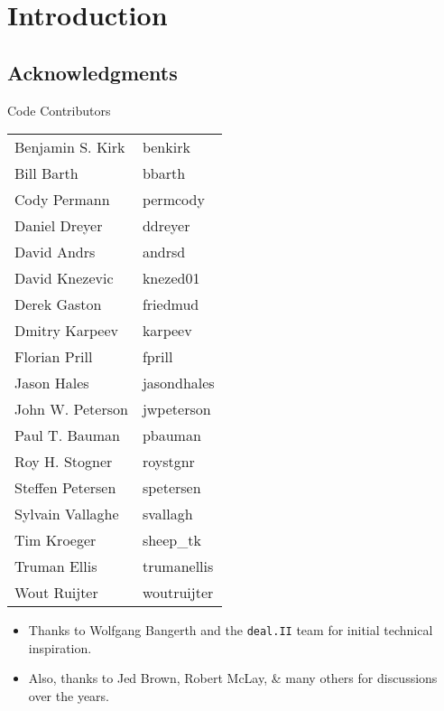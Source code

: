 




\section{Introduction}

\subsection{Acknowledgments}
\begin{frame}[shrink]
  \begin{block}{Code Contributors}
    \scriptsize
    \begin{center}
      \begin{tabular}{|l|l|} \hline
        Benjamin S. Kirk & benkirk \\
        Bill Barth       & bbarth \\
        Cody Permann     & permcody \\
        Daniel Dreyer    & ddreyer \\
        David Andrs      & andrsd \\
        David Knezevic   & knezed01 \\
        Derek Gaston     & friedmud \\
        Dmitry Karpeev   & karpeev \\
        Florian Prill    & fprill \\
        Jason Hales      & jasondhales \\
        John W. Peterson & jwpeterson \\
        Paul T. Bauman   & pbauman \\
        Roy H. Stogner   & roystgnr \\
        Steffen Petersen & spetersen \\
        Sylvain Vallaghe & svallagh \\
        Tim Kroeger      & sheep\_tk \\
        Truman Ellis     & trumanellis \\
        Wout Ruijter     & woutruijter \\ \hline
      \end{tabular}
    \end{center}
    \begin{itemize}
      \item Thanks to Wolfgang Bangerth and the \texttt{deal.II} team for initial technical inspiration. 
      \item Also, thanks to Jed Brown, Robert McLay, \& many others for discussions over the years.
    \end{itemize}
  \end{block}
\end{frame}

